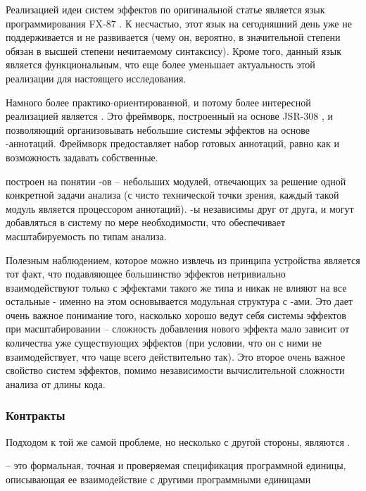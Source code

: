 Реализацией идеи систем эффектов по оригинальной статье является язык программирования FX-87 \cite{FX87}. К несчастью, этот язык на сегодняшний день уже не поддерживается и не развивается (чему он, вероятно, в значительной степени обязан в высшей степени нечитаемому синтаксису). Кроме того, данный язык является функциональным, что еще более уменьшает актуальность этой реализации для настоящего исследования.

Намного более практико-ориентированной, и потому более интересной реализацией является  \cite{checker-framework}. Это фреймворк, построенный на основе JSR-308 \cite{JSR308}, и позволяющий организовывать небольшие системы эффектов на основе -аннотаций. Фреймворк предоставляет набор готовых аннотаций, равно как и возможность задавать собственные.

 построен на понятии -ов -- небольших модулей, отвечающих за решение одной конкретной задачи анализа (с чисто технической точки зрения, каждый такой модуль является процессором аннотаций). -ы независимы друг от друга, и могут добавляться в систему по мере необходимости, что обеспечивает масштабируемость по типам анализа.

Полезным наблюдением, которое можно извлечь из принципа устройства  является тот факт, что подавляющее большинство эффектов нетривиально взаимодействуют только с эффектами такого же типа и никак не влияют на все остальные - именно на этом основывается модульная структура с -ами. Это дает очень важное понимание того, насколько хорошо ведут себя системы эффектов при масштабировании -- сложность добавления нового эффекта мало зависит от количества уже существующих эффектов (при условии, что он с ними не взаимодействует, что чаще всего действительно так). Это второе очень важное свойство систем эффектов, помимо независимости вычислительной сложности анализа от длины кода.








\subsubsection{Контракты}

Подходом к той же самой проблеме, но несколько с другой стороны, являются .

\begin{definition}
  \label{def-contract}
   -- это формальная, точная и проверяемая спецификация программной единицы, описывающая ее взаимодействие с другими программными единицами \cite{Meyer92}
\end{definition}

